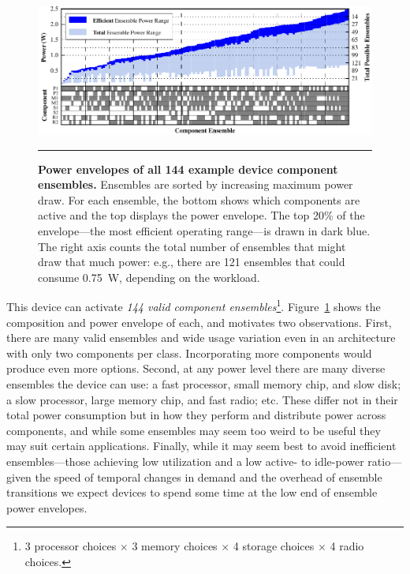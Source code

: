 \begin{figure}[t]
\includegraphics{./figures/componentgraph.pdf}

\caption{\small \textbf{Power envelopes of all 144 example device component
ensembles.} Ensembles are sorted by increasing maximum power draw. For each
ensemble, the bottom shows which components are active and the top displays
the power envelope. The top 20\% of the envelope---the most efficient
operating range---is drawn in dark blue. The right axis counts the total
number of ensembles that might draw that much power: e.g., there are 121
ensembles that could consume 0.75~W, depending on the workload.}

\vspace{0.10in}
\hrule
\vspace{-0.20in}
\label{figure-componentgraph}
\end{figure}


This device can activate \textit{144 valid component ensembles}\footnote{3
processor choices $\times$ 3 memory choices $\times$ 4 storage choices
$\times$ 4 radio choices.}. Figure~\ref{figure-componentgraph} shows the
composition and power envelope of each, and motivates two observations.
First, there are many valid ensembles and wide usage variation even in an
architecture with only two components per class. Incorporating more
components would produce even more options. Second, at any power level there
are many diverse ensembles the device can use: a fast processor, small memory
chip, and slow disk; a slow processor, large memory chip, and fast radio;
etc. These differ not in their total power consumption but in how they
perform and distribute power across components, and while some ensembles may
seem too weird to be useful they may suit certain applications. Finally,
while it may seem best to avoid inefficient ensembles---those achieving low
utilization and a low active- to idle-power ratio---given the speed of
temporal changes in demand and the overhead of ensemble transitions we expect
devices to spend some time at the low end of ensemble power envelopes.
